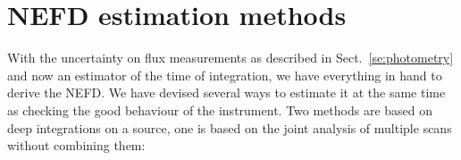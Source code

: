 

\section{NEFD estimation methods}
\label{se:nefd_estimation_methods}

With the uncertainty on flux measurements as described in Sect.~\ref{se:photometry} and
now an estimator of the time of integration, we have everything in hand to derive
the NEFD. We have devised several ways to estimate it at the same time as
checking the good behaviour of the instrument. Two methods are based on deep
integrations on a source, one is based on the joint analysis of multiple scans
without combining them:

